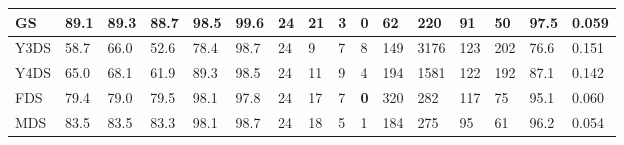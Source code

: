 \begin{table}[]
{\begin{tabular}{|l|l|l|l|l|l|l|l|l|l|l|l|l|l|l|l|}
			GS     & 89.1          & 89.3          & 88.7          & 98.5                                                   & 99.6                                                   & 24   & 21                                                   & 3                                                    & \textbf{0}                                           & 62                                                   & 220                                                  & 91                                                    & 50                                                   & 97.5          & 0.059          \\ \hline
			Y3DS   & 58.7          & 66.0          & 52.6          & 78.4                                                   & 98.7                                                   & 24   & 9                                                    & 7                                                    & 8                                                    & 149                                                  & 3176                                                 & 123                                                   & 202                                                  & 76.6          & 0.151          \\ \hline
			Y4DS   & 65.0          & 68.1          & 61.9          & 89.3                                                   & 98.5                                                   & 24   & 11                                                   & 9                                                    & 4                                                    & 194                                                  & 1581                                                 & 122                                                   & 192                                                  & 87.1          & 0.142          \\ \hline
			FDS    & 79.4          & 79.0          & 79.5          & 98.1                                                   & 97.8                                                   & 24   & 17                                                   & 7                                                    & \textbf{0}                                           & 320                                                  & 282                                                  & 117                                                   & 75                                                   & 95.1          & 0.060          \\ \hline
			MDS    & 83.5          & 83.5          & 83.3          & 98.1                                                   & 98.7                                                   & 24   & 18                                                   & 5                                                    & 1                                                    & 184                                                  & 275                                                  & 95                                                    & 61                                                   & 96.2          & 0.054          \\ \hline

\end{tabular}}
\end{table}
